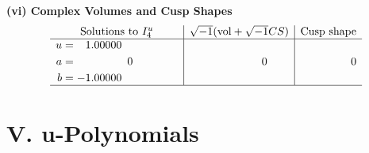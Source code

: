 \documentclass[1p]{elsarticle_modified}
\theoremstyle{definition}
\newcommand{\I}{\sqrt{-1}}
\begin{document}
\newpage\flushleft \textbf{(vi) Complex Volumes and Cusp Shapes}
$$\begin{array}{c|c|c}  
\text{Solutions to }I^u_{4}& \I (\text{vol} + \sqrt{-1}CS) & \text{Cusp shape}\\
 \hline 
\begin{aligned}
u &= \phantom{-}1.00000\phantom{ +0.000000I} \\
a &= \phantom{-0.000000 } 0 \\
b &= -1.00000\phantom{ +0.000000I}\end{aligned}
 & \phantom{-0.000000 } 0 & \phantom{-0.000000 } 0\\
 \hline 
 \end{array}$$\newpage
\newpage\renewcommand{\arraystretch}{1}
\centering \section*{ V. u-Polynomials}
\end{document}
